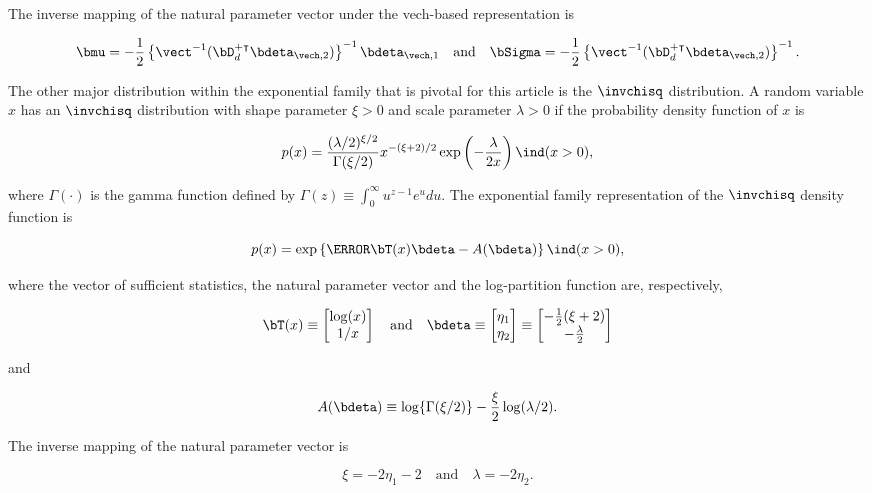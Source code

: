 \documentclass[12pt]{article}
\theoremstyle{plain}
\theoremstyle{definition}
\theoremstyle{remark}
\begin{document}
\noindent The inverse mapping of the natural parameter vector under the vech-based representation is

\begin{equation}
	\bmu = -\frac12 \left\{ \vect^{-1} (\bD_d^{+ \intercal}\bdeta_{\vech, 2}) \right\}^{-1} \bdeta_{\vech, 1} \quad
	\text{and} \quad
	\bSigma = -\frac12 \left\{ \vect^{-1} (\bD_d^{+ \intercal}\bdeta_{\vech, 2}) \right\}^{-1}.
\label{gauss_vech_comm_params}
\end{equation}

The other major distribution within the exponential family that is pivotal for this article is the $\invchisq$ distribution.
A random variable $x$ has an $\invchisq$ distribution with shape parameter $\xi > 0$ and scale parameter
$\lambda > 0$ if the probability density function of $x$ is

\[
	p(x) = 
		\frac{(\lambda/2)^{\xi/2}}{\Gamma (\xi/2)}
		x^{-(\xi + 2)/2} \exp \left( -\frac{\lambda}{2 x} \right) \ind (x > 0),
\]

\noindent where $\Gamma (\cdot)$ is the gamma function defined by $\Gamma (z) \equiv \int_0^\infty u^{z - 1} e^u
du$. The exponential family representation of the $\invchisq$ density function is

\[
	p(x) = \exp \left\{ \T{\bT (x)} \bdeta - A(\bdeta) \right\} \ind (x > 0),
\]

\noindent where the vector of sufficient statistics, the natural parameter vector and the log-partition function are,
respectively,

\[
	\bT (x) \equiv \begin{bmatrix}
		\log (x) \\
		1/x
	\end{bmatrix} \quad
	\text{and} \quad
	\bdeta \equiv \begin{bmatrix}
		\eta_1 \\
		\eta_2
	\end{bmatrix} \equiv \begin{bmatrix}
		-\frac12 (\xi + 2) \\
		-\frac{\lambda}{2}
	\end{bmatrix}
\]

\noindent and

\[
	A(\bdeta) \equiv \log \{ \Gamma (\xi/2) \} - \frac{\xi}{2} \log (\lambda/2).
\]

\noindent The inverse mapping of the natural parameter vector is \cite[equation~8]{maestrini20}

\[
	\xi = -2 \eta_1 - 2 \quad
	\text{and} \quad
	\lambda = -2 \eta_2.
\]
\end{document}

